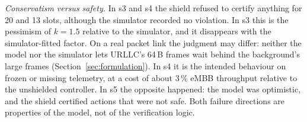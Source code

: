 \emph{Conservatism versus safety.} In s3 and s4 the shield refused to certify
anything for 20 and 13 slots, although the simulator recorded no violation. In s3
this is the pessimism of $k=1.5$ relative to the simulator, and it disappears with
the simulator-fitted factor. On a real packet link the judgment may differ: neither
the model nor the simulator lets URLLC's 64\,B frames wait behind the background's
large frames (Section~\ref{sec:formulation}). In s4 it is the
intended behaviour on frozen or missing telemetry, at a cost of about 3\,\% eMBB
throughput relative to the unshielded controller. In s5 the opposite happened: the
model was optimistic, and the shield certified actions that were not safe. Both
failure directions are properties of the model, not of the verification logic.
